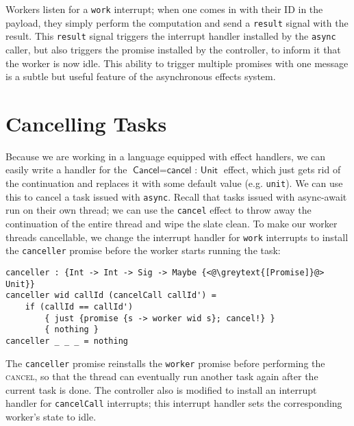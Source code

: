 \documentclass[msc,deptreport,cs]{infthesis} %
\newcommand{\code}[1]{\lstinline{#1}}
\newcommand{\greytext}[1]{\textcolor{black!40}{#1}}
\newcommand{\todo}[1]
           {{\par\noindent\small\color{RoyalPurple}
  \framebox{\parbox{\dimexpr\linewidth-2\fboxsep-2\fboxrule}
    {\textbf{TODO:} #1}}}}
\begin{document}
Workers listen for a \code{work} interrupt; when one comes in with their ID in
the payload, they simply perform the computation and send a \code{result} signal
with the result. This \code{result} signal triggers the interrupt handler
installed by the \code{async} caller, but also triggers the promise installed by
the controller, to inform it that the worker is now idle. This ability to
trigger multiple promises with one message is a subtle but useful feature of the
asynchronous effects system.

\section{Cancelling Tasks}

Because we are working in a language equipped with effect handlers, we can
easily write a handler for the $\textsf{Cancel} = \textsf{cancel : Unit}$
effect, which just gets rid of the continuation and replaces it with some
default value (e.g. \code{unit}). We can use this to cancel a task issued with
\code{async}. Recall that tasks issued with async-await run on their own thread;
we can use the \code{cancel} effect to throw away the continuation of the entire
thread and wipe the slate clean. To make our worker threads cancellable, we
change the interrupt handler for \code{work} interrupts to install the
\code{canceller} promise before the worker starts running the task:


\begin{lstlisting}
canceller : {Int -> Int -> Sig -> Maybe {<@\greytext{[Promise]}@> Unit}}
canceller wid callId (cancelCall callId') =
    if (callId == callId')
        { just {promise {s -> worker wid s}; cancel!} }
        { nothing }
canceller _ _ _ = nothing
\end{lstlisting}


\noindent The \code{canceller} promise reinstalls the \code{worker} promise
before performing the \textsc{cancel}, so that the thread can eventually run
another task again after the current task is done. The controller also is
modified to install an interrupt handler for \code{cancelCall} interrupts; this
interrupt handler sets the corresponding worker's state to idle.
\end{document}
